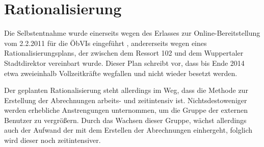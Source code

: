 
\section{Rationalisierung} \label{sec:rationalisierung}
Die Selbstentnahme wurde einerseits wegen des Erlasses zur Online-Bereitstellung vom 2.2.2011 für die \acp{ÖbVI} eingeführt \autocite[vgl.][]{wupp-wunda-oebvi}, andererseits wegen eines Rationalisierungsplans, der zwischen dem Ressort 102 und dem Wuppertaler Stadtdirektor vereinbart wurde.
Dieser Plan schreibt vor, dass bis Ende 2014 etwa zweieinhalb  Vollzeitkräfte wegfallen und nicht wieder besetzt werden.

Der geplanten Rationalisierung steht allerdings im Weg, dass die Methode zur Erstellung der Abrechnungen arbeits- und zeitintensiv ist.
Nichtsdestoweniger werden erhebliche Anstrengungen unternommen, um die Gruppe der externen Benutzer zu vergrößern.
Durch das Wachsen dieser Gruppe, wächst allerdings auch der Aufwand der mit dem Erstellen der Abrechnungen einhergeht, folglich wird dieser noch zeitintensiver.

